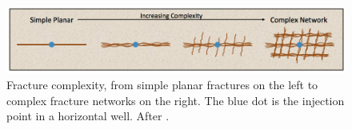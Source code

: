 \begin{figure}
    \begin{center}
    \includegraphics[width=\columnwidth]{figures/phys_prop_model/frac_complexity.png}
    \end{center}
\caption{
    Fracture complexity, from simple planar fractures on the left to complex fracture
    networks on the right. The blue dot is the injection point in a horizontal well. After \cite{Cipolla2008a}.
}
\label{fig:frac_complexity}
\end{figure}
